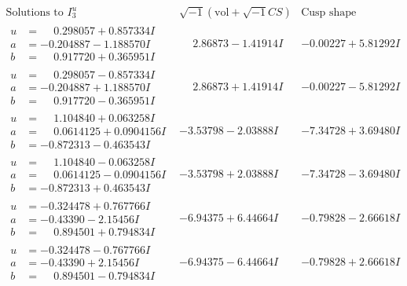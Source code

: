 \documentclass[1p]{elsarticle_modified}
\theoremstyle{definition}
\newcommand{\I}{\sqrt{-1}}
\begin{document}
$$\begin{array}{c|c|c}  
\text{Solutions to }I^u_{3}& \I (\text{vol} + \sqrt{-1}CS) & \text{Cusp shape}\\
 \hline 
\begin{aligned}
u &= \phantom{-}0.298057 + 0.857334 I \\
a &= -0.204887 - 1.188570 I \\
b &= \phantom{-}0.917720 + 0.365951 I\end{aligned}
 & \phantom{-}2.86873 - 1.41914 I & -0.00227 + 5.81292 I \\ \hline\begin{aligned}
u &= \phantom{-}0.298057 - 0.857334 I \\
a &= -0.204887 + 1.188570 I \\
b &= \phantom{-}0.917720 - 0.365951 I\end{aligned}
 & \phantom{-}2.86873 + 1.41914 I & -0.00227 - 5.81292 I \\ \hline\begin{aligned}
u &= \phantom{-}1.104840 + 0.063258 I \\
a &= \phantom{-}0.0614125 + 0.0904156 I \\
b &= -0.872313 - 0.463543 I\end{aligned}
 & -3.53798 - 2.03888 I & -7.34728 + 3.69480 I \\ \hline\begin{aligned}
u &= \phantom{-}1.104840 - 0.063258 I \\
a &= \phantom{-}0.0614125 - 0.0904156 I \\
b &= -0.872313 + 0.463543 I\end{aligned}
 & -3.53798 + 2.03888 I & -7.34728 - 3.69480 I \\ \hline\begin{aligned}
u &= -0.324478 + 0.767766 I \\
a &= -0.43390 - 2.15456 I \\
b &= \phantom{-}0.894501 + 0.794834 I\end{aligned}
 & -6.94375 + 6.44664 I & -0.79828 - 2.66618 I \\ \hline\begin{aligned}
u &= -0.324478 - 0.767766 I \\
a &= -0.43390 + 2.15456 I \\
b &= \phantom{-}0.894501 - 0.794834 I\end{aligned}
 & -6.94375 - 6.44664 I & -0.79828 + 2.66618 I \\ \hline\begin{aligned}

\end{aligned}
\end{array}$$
\end{document}
